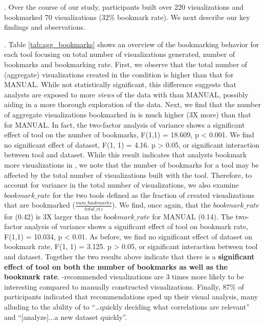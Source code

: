 .
Over the course of our study, participants built over 220 visualizations 
and bookmarked 70 visualizations (32\% bookmark rate).
We next describe our key findings and observations.

.
Table \ref{tab:agg_bookmarks} shows an overview of the bookmarking behavior for each tool
focusing on total number of visualizations generated, number of bookmarks and bookmarking rate.
First, we observe that the total number of (aggregate) visualizations created in the \SeeDB
condition is higher than that for MANUAL. 
While not statistically significant, this difference suggests that analysts are exposed to more
{\em views} of the data with \SeeDB than MANUAL, possibly aiding in a more thorough exploration of
the data.
Next, we find that the number of aggregate visualizations bookmarked in \SeeDB is much higher (3X more)
than that for MANUAL.
In fact, the two-factor analysis of variance shows a significant effect of tool on the number of bookmarks,
F(1,1) = 18.609, p < 0.001. 
We find no significant effect of dataset, F(1, 1) = 4.16. p > 0.05, or
significant interaction between tool and dataset.
While this result indicates that analysts bookmark more visualizations in \SeeDB, we note that the number of 
bookmarks for a tool may be affected by the total number of visualizations built with the tool.
Therefore, to account for variance in the total number of visualizations, we also examine $bookmark\_rate$
for the two tools defined as the fraction of
created visualizations that are bookmarked ($\frac{num\_bookmarks}{total\_viz}$).
We find, once again, that the $bookmark\_rate$ for \SeeDB (0.42) is 3X larger than the $bookmark\_rate$ for 
MANUAL (0.14).
The two-factor analysis of variance shows a significant effect of tool on bookmark rate, F(1,1) = 10.034, p < 0.01.
As before, we find no significant effect of dataset on bookmark rate, F(1, 1) = 3.125. p > 0.05, or
significant interaction between tool and dataset.
Together the two results above indicate that there is a {\bf significant effect of tool on both the number of bookmarks as well as the
bookmark rate}.
\SeeDB-recommended visualizations are 3 times more likely to be interesting compared
to manually constructed visualizations.
Finally, 87\% of participants indicated that \SeeDB recommendations sped up their visual analysis, many alluding
to the ability of \SeeDB to ``\ldots quickly deciding what correlations are relevant'' and 
``[analyze]...a new dataset quickly''.


